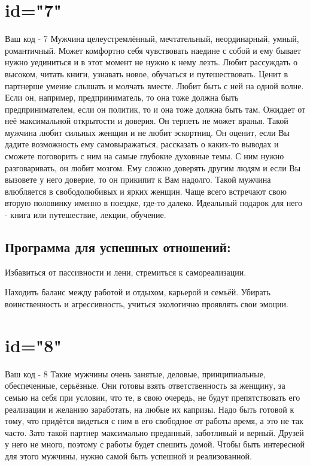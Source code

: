 \section{id="7"}{Ваш код - 7}
Мужчина целеустремлённый, мечтательный, неординарный, умный, 
романтичный. Может комфортно себя чувствовать наедине с собой и ему 
бывает нужно уединиться и в этот момент не нужно к нему лезть. Любит 
рассуждать о высоком, читать книги, узнавать новое, обучаться и 
путешествовать. Ценит в партнерше умение слышать и молчать вместе. 
Любит быть с ней на одной волне. Если он, например, предприниматель, 
то она тоже должна быть предпринимателем, если он политик, то и она 
тоже должна быть там. Ожидает от неё максимальной открытости и 
доверия. Он терпеть не может вранья. Такой мужчина любит сильных 
женщин и не любит эскортниц. Он оценит, если Вы дадите возможность 
ему самовыражаться, рассказать о каких-то выводах и сможете 
поговорить с ним на самые глубокие духовные темы. С ним нужно 
разговаривать, он любит мозгом. Ему сложно доверять другим людям 
и если Вы вызовете у него доверие, то он прикипит к Вам надолго. 
Такой мужчина влюбляется в свободолюбивых и ярких женщин. Чаще 
всего встречают свою вторую половинку именно в поездке, где-то 
далеко. Идеальный подарок для него - книга или путешествие, лекции, 
обучение.
\subsection{Программа для успешных отношений:}
\item Избавиться от пассивности и лени, стремиться к самореализации.
\item Находить баланс между работой и отдыхом, карьерой и семьёй. 
Убирать воинственность и агрессивность, учиться экологично проявлять 
свои эмоции.
\endsubsection
\endsection

\section{id="8"}{Ваш код - 8}
Такие мужчины очень занятые, деловые, принципиальные, обеспеченные, 
серьёзные. Они готовы взять ответственность за женщину, за семью 
на себя при условии, что те, в свою очередь, не будут препятствовать 
его реализации и желанию заработать, на любые их капризы. Надо быть 
готовой к тому, что придётся видеться с ним в его свободное от работы 
время, а это не так часто. Зато такой партнер максимально преданный, 
заботливый и верный. Друзей у него не много, поэтому с работы будет 
спешить домой. Чтобы быть интересной для этого мужчины, нужно самой 
быть успешной и реализованной.
